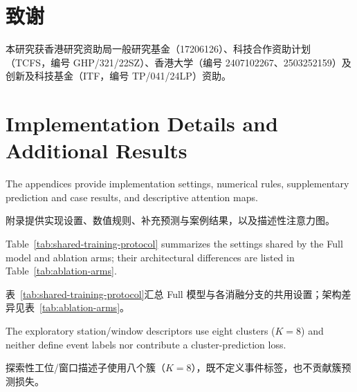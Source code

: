 \documentclass[a4paper,fleqn]{cas-dc}
\newcommand{\zhpara}[1]{%
  \par\begingroup\small\color{black!72}\noindent #1\par\endgroup}
\begin{document}
\zhpara{\section*{致谢}
本研究获香港研究资助局一般研究基金（17206126）、科技合作资助计划（TCFS，编号 GHP/321/22SZ）、香港大学（编号 2407102267、2503252159）及创新及科技基金（ITF，编号 TP/041/24LP）资助。}





\appendix
\renewcommand{\dblfloatpagefraction}{0.7}
\section{Implementation Details and Additional Results}\label{app:additional}

The appendices provide implementation settings, numerical rules, supplementary prediction and case results, and descriptive attention maps.

\zhpara{附录提供实现设置、数值规则、补充预测与案例结果，以及描述性注意力图。}


Table~\ref{tab:shared-training-protocol} summarizes the settings shared by the Full model and ablation arms; their architectural differences are listed in Table~\ref{tab:ablation-arms}.

\zhpara{表~\ref{tab:shared-training-protocol}汇总 Full 模型与各消融分支的共用设置；架构差异见表~\ref{tab:ablation-arms}。}


The exploratory station/window descriptors use eight clusters ($K=8$) and neither define event labels nor contribute a cluster-prediction loss.

\zhpara{探索性工位/窗口描述子使用八个簇（$K=8$），既不定义事件标签，也不贡献簇预测损失。}
\end{document}
